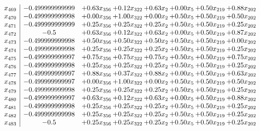 \documentclass[8pt]{article}
\begin{document}
\[\begin{array}{c| c c@{\hskip 2pt} c@{\hskip 2pt} c@{\hskip 2pt} c@{\hskip 2pt} c@{\hskip 2pt} c@{\hskip 2pt} }
 x_{469}   &  -0.499999999999 & +  0.63 x_{356} & +  0.12 x_{322} & +  0.63 x_{2} & +  0.00 x_{5} & +  0.50 x_{219} & +  0.88 x_{202}\\
 x_{470}   &  -0.499999999998 & +  0.00 x_{356} & +  1.00 x_{322} & +  0.00 x_{2} & +  0.50 x_{5} & +  0.50 x_{219} & +  0.50 x_{202}\\
 x_{471}   &  -0.499999999999 & +  0.25 x_{356} & +  0.25 x_{322} & +  0.25 x_{2} & +  0.50 x_{5} & +  0.50 x_{219} & +  0.25 x_{202}\\
 x_{472}   &  -0.5 & +  0.63 x_{356} & +  0.12 x_{322} & +  0.63 x_{2} & +  0.00 x_{5} & +  0.50 x_{219} & +  0.87 x_{202}\\
 x_{473}   &  -0.499999999998 & +  0.50 x_{356} & +  0.50 x_{322} & +  0.50 x_{2} & +  0.50 x_{5} & +  0.50 x_{219} & +  0.00 x_{202}\\
 x_{474}   &  -0.499999999998 & +  0.25 x_{356} & +  0.25 x_{322} & +  0.25 x_{2} & +  0.50 x_{5} & +  0.50 x_{219} & +  0.25 x_{202}\\
 x_{475}   &  -0.499999999997 & +  0.75 x_{356} & +  0.75 x_{322} & +  0.75 x_{2} & +  0.50 x_{5} & +  0.50 x_{219} & +  0.75 x_{202}\\
 x_{476}   &  -0.499999999998 & +  0.25 x_{356} & +  0.25 x_{322} & +  0.25 x_{2} & +  0.50 x_{5} & +  0.50 x_{219} & +  0.25 x_{202}\\
 x_{477}   &  -0.499999999997 & +  0.88 x_{356} & +  0.37 x_{322} & +  0.88 x_{2} & +  0.00 x_{5} & +  0.50 x_{219} & +  0.63 x_{202}\\
 x_{478}   &  -0.499999999997 & +  0.00 x_{356} & +  1.00 x_{322} & +  0.00 x_{2} & +  0.50 x_{5} & +  0.50 x_{219} & +  0.50 x_{202}\\
 x_{479}   &  -0.499999999998 & +  0.25 x_{356} & +  0.25 x_{322} & +  0.25 x_{2} & +  0.50 x_{5} & +  0.50 x_{219} & +  0.25 x_{202}\\
 x_{480}   &  -0.499999999997 & +  0.63 x_{356} & +  0.12 x_{322} & +  0.63 x_{2} & +  0.00 x_{5} & +  0.50 x_{219} & +  0.88 x_{202}\\
 x_{481}   &  -0.499999999998 & +  0.25 x_{356} & +  0.25 x_{322} & +  0.25 x_{2} & +  0.50 x_{5} & +  0.50 x_{219} & +  0.25 x_{202}\\
 x_{482}   &  -0.499999999998 & +  0.25 x_{356} & +  0.25 x_{322} & +  0.25 x_{2} & +  0.50 x_{5} & +  0.50 x_{219} & +  0.25 x_{202}\\
 x_{483}   &  -0.5 & +  0.25 x_{356} & +  0.25 x_{322} & +  0.25 x_{2} & +  0.50 x_{5} & +  0.50 x_{219} & +  0.25 x_{202}\\

\end{array}\]
\end{document}
